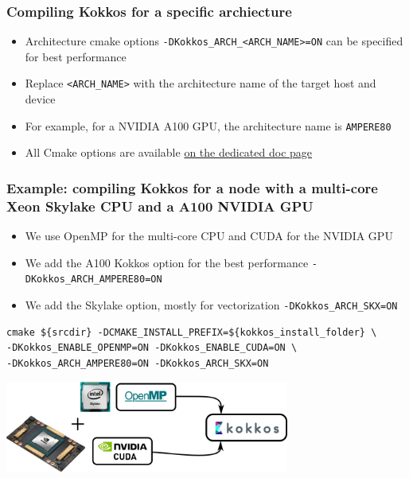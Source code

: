 \documentclass[aspectratio=169]{beamer}
\begin{document}

\begin{frame}[fragile]
    \frametitle{Compiling Kokkos for a specific archiecture}

\begin{itemize}
    \item Architecture cmake options \texttt{-DKokkos\_ARCH\_<ARCH\_NAME>=ON} can be specified for best performance
    \item Replace \texttt{<ARCH\_NAME>} with the architecture name of the target host and device
    \item For example, for a NVIDIA A100 GPU, the architecture name is \texttt{AMPERE80}
    \item All Cmake options are available \href{https://kokkos.org/kokkos-core-wiki/keywords.html#}{on the dedicated doc page}
\end{itemize}

\end{frame}


\begin{frame}[fragile]
    \frametitle{Example: compiling Kokkos for a node with a multi-core Xeon Skylake CPU and a A100 NVIDIA GPU} 

\begin{itemize}
    \item We use OpenMP for the multi-core CPU and CUDA for the NVIDIA GPU
    \item We add the A100 Kokkos option for the best performance \texttt{-DKokkos\_ARCH\_AMPERE80=ON}
    \item We add the Skylake option, mostly for vectorization \texttt{-DKokkos\_ARCH\_SKX=ON}
\end{itemize}

\footnotesize
\begin{verbatim}
cmake ${srcdir} -DCMAKE_INSTALL_PREFIX=${kokkos_install_folder} \
-DKokkos_ENABLE_OPENMP=ON -DKokkos_ENABLE_CUDA=ON \
-DKokkos_ARCH_AMPERE80=ON -DKokkos_ARCH_SKX=ON
\end{verbatim}

\hspace{0.5cm}

\centering
\includegraphics[width=0.7\textwidth]{../../images/kokkos_a100_backend.png}

\end{frame}
\end{document}
